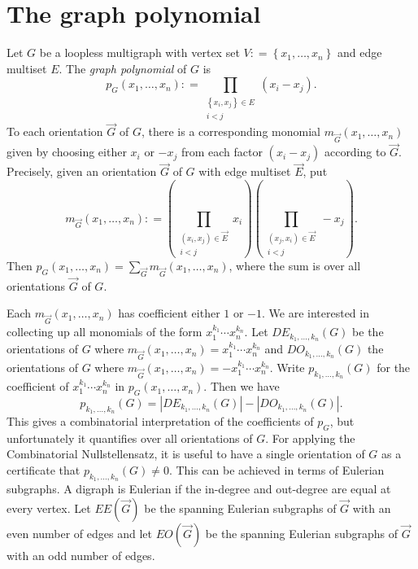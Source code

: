 \documentclass[openany]{tufte-book} %
\theoremstyle{plain}
\newcommand{\set}[1]{\left\{ #1 \right\}}
\newcommand{\parens}[1]{\left( #1 \right)}
\newcommand{\DefinedAs}{\mathrel{\mathop:}=}
\begin{document}
\section{The graph polynomial}
Let $G$ be a loopless multigraph with vertex set $V \DefinedAs \set{x_1, \ldots, x_n}$ and edge multiset $E$.  The \emph{graph polynomial} of $G$ is
\[p_G(x_1,\ldots,x_n) \DefinedAs \prod_{\substack{\set{x_i,x_j} \in E\\i < j}} (x_i - x_j).\]
To each orientation $\vec{G}$ of $G$, there is a corresponding monomial $m_{\vec{G}}(x_1,\ldots, x_n)$ given by choosing either $x_i$ or $-x_j$ from each factor $(x_i - x_j)$ according to $\vec{G}$. Precisely, given an orientation $\vec{G}$ of $G$ with edge multiset $\vec{E}$, put
\[m_{\vec{G}}(x_1,\ldots, x_n) \DefinedAs \parens{\prod_{\substack{(x_i,x_j) \in \vec{E}\\i < j}} x_i}\parens{\prod_{\substack{(x_j,x_i) \in \vec{E}\\i < j}} -x_j}.\]
Then $p_G(x_1,\ldots,x_n) = \sum_{\vec{G}} m_{\vec{G}}(x_1,\ldots, x_n)$, where the sum is over all orientations $\vec{G}$ of $G$.  

Each $m_{\vec{G}}(x_1,\ldots, x_n)$ has coefficient either $1$ or $-1$.   
We are interested in collecting up all monomials of the form $x_1^{k_1}\cdots x_n^{k_n}$.  Let $DE_{k_1,\ldots, k_n}(G)$ be the orientations of $G$ 
where $m_{\vec{G}}(x_1,\ldots, x_n) = x_1^{k_1}\cdots x_n^{k_n}$ and $DO_{k_1,\ldots, k_n}(G)$ the orientations of $G$ where $m_{\vec{G}}(x_1,\ldots, x_n) = -x_1^{k_1}\cdots x_n^{k_n}$.  
Write $p_{k_1, \ldots, k_n}(G)$ for the coefficient of $x_1^{k_1}\cdots x_n^{k_n}$ in $p_G(x_1,\ldots,x_n)$.  Then we have
\[p_{k_1, \ldots, k_n}(G) = |DE_{k_1,\ldots, k_n}(G)| - |DO_{k_1,\ldots, k_n}(G)|.\]
This gives a combinatorial interpretation of the coefficients of $p_G$, but unfortunately it quantifies over all orientations of $G$.  
For applying the Combinatorial Nullstellensatz, it is useful to have a single orientation of $G$ as a certificate that $p_{k_1, \ldots, k_n}(G) \ne 0$.  
This can be achieved in terms of Eulerian subgraphs.  A digraph is Eulerian if the in-degree and out-degree are equal at every vertex.  
Let $EE(\vec{G})$ be the spanning Eulerian subgraphs of $\vec{G}$ with an even number of edges and let $EO(\vec{G})$ be the spanning Eulerian subgraphs of $\vec{G}$ with an odd number of edges.  
\end{document}
